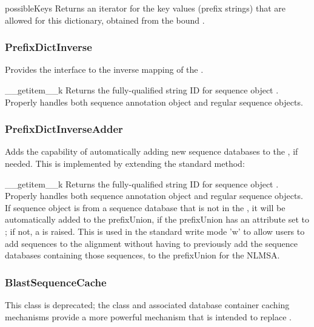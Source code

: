 \documentclass{howto}
\begin{document}
\begin{funcdesc}{possibleKeys}{}
  Returns an iterator for the key values (prefix strings) that are allowed for 
  this dictionary, obtained from the bound .
\end{funcdesc}

\subsubsection{PrefixDictInverse}
Provides the interface to the inverse mapping of the .
\begin{funcdesc}{__getitem__}{k}
  Returns the fully-qualified string ID for sequence object .  
  Properly handles both sequence annotation object and regular sequence
  objects.
\end{funcdesc}

\subsubsection{PrefixDictInverseAdder}
Adds the capability of automatically adding new sequence databases to the
, if needed.  This is implemented by extending
the standard  method:
\begin{funcdesc}{__getitem__}{k}
  Returns the fully-qualified string ID for sequence object .  
  Properly handles both sequence annotation object and regular sequence
  objects.  If sequence object  is from a sequence database that
  is not in the , it will be automatically added
  to the prefixUnion, if the prefixUnion has an  attribute
  set to ; if not, a  is raised.
  This is used in the standard  write mode 'w'
  to allow users to add sequences to the alignment without having to 
  previously add the sequence databases containing those sequences, 
  to the prefixUnion for the NLMSA.
\end{funcdesc}



\subsubsection{BlastSequenceCache}

This class is deprecated; the  class and associated
database container caching mechanisms provide a more powerful mechanism
that is intended to replace .
\end{document}
